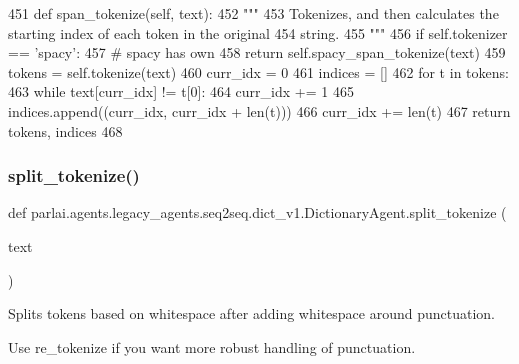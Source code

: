 \begin{DoxyCode}
451     \textcolor{keyword}{def }span\_tokenize(self, text):
452         \textcolor{stringliteral}{"""}
453 \textcolor{stringliteral}{        Tokenizes, and then calculates the starting index of each token in the original}
454 \textcolor{stringliteral}{        string.}
455 \textcolor{stringliteral}{        """}
456         \textcolor{keywordflow}{if} self.tokenizer == \textcolor{stringliteral}{'spacy'}:
457             \textcolor{comment}{# spacy has own}
458             \textcolor{keywordflow}{return} self.spacy\_span\_tokenize(text)
459         tokens = self.tokenize(text)
460         curr\_idx = 0
461         indices = []
462         \textcolor{keywordflow}{for} t \textcolor{keywordflow}{in} tokens:
463             \textcolor{keywordflow}{while} text[curr\_idx] != t[0]:
464                 curr\_idx += 1
465             indices.append((curr\_idx, curr\_idx + len(t)))
466             curr\_idx += len(t)
467         \textcolor{keywordflow}{return} tokens, indices
468 
\end{DoxyCode}
\mbox{\label{classparlai_1_1agents_1_1legacy__agents_1_1seq2seq_1_1dict__v1_1_1DictionaryAgent_aed9556a06d40dbe376350c6c00694843}} 
\subsubsection{\texorpdfstring{split\+\_\+tokenize()}{split\_tokenize()}}
{\footnotesize\ttfamily def parlai.\+agents.\+legacy\+\_\+agents.\+seq2seq.\+dict\+\_\+v1.\+Dictionary\+Agent.\+split\+\_\+tokenize (\begin{DoxyParamCaption}\item[{}]{text }\end{DoxyParamCaption})\hspace{0.3cm}{\ttfamily [static]}}

\begin{DoxyVerb}Splits tokens based on whitespace after adding whitespace around punctuation.

Use re_tokenize if you want more robust handling of punctuation.
\end{DoxyVerb}
 

